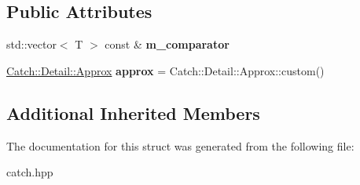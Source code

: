 \subsection*{Public Attributes}
\begin{DoxyCompactItemize}
\item 
\mbox{\label{structCatch_1_1Matchers_1_1Vector_1_1ApproxMatcher_a1394b5913d30bdd1147e1941fc41af56}} 
std\+::vector$<$ T $>$ const  \& {\bfseries m\+\_\+comparator}
\item 
\mbox{\label{structCatch_1_1Matchers_1_1Vector_1_1ApproxMatcher_a5515447af58adb5dc48a5d300b9ae162}} 
\mbox{\hyperlink{classCatch_1_1Detail_1_1Approx}{Catch\+::\+Detail\+::\+Approx}} {\bfseries approx} = Catch\+::\+Detail\+::\+Approx\+::custom()
\end{DoxyCompactItemize}
\subsection*{Additional Inherited Members}


The documentation for this struct was generated from the following file\+:\begin{DoxyCompactItemize}
\item 
catch.\+hpp\end{DoxyCompactItemize}
